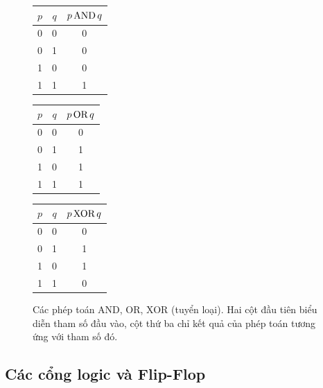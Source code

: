 \begin{figure}[tb]
\centering
  \begin{minipage}{1.5in}
    \begin{tabular}{cc|c}
      $p$ & $q$ & $p \operatorname{\mbox{AND}} q$ \\
      \hline
      0 & 0 & 0 \\
      0 & 1 & 0 \\
      1 & 0 & 0 \\
      1 & 1 & 1
    \end{tabular}
  \end{minipage}
  \begin{minipage}{1.5in}
    \begin{tabular}{cc|c}
      $p$ & $q$ & $p \operatorname{\mbox{OR}} q$ \\
      \hline
      0 & 0 & 0 \\
      0 & 1 & 1 \\
      1 & 0 & 1 \\
      1 & 1 & 1
    \end{tabular}
  \end{minipage}
  \begin{minipage}{1.5in}
    \begin{tabular}{cc|c}
      $p$ & $q$ & $p \operatorname{\mbox{XOR}} q$ \\
      \hline
      0 & 0 & 0 \\
      0 & 1 & 1 \\
      1 & 0 & 1 \\
      1 & 1 & 0
    \end{tabular}
  \end{minipage}
  \caption{Các phép toán AND, OR, XOR (tuyển loại). Hai cột đầu tiên biểu diễn tham số đầu
    vào, cột thứ ba chỉ kết quả của phép toán tương ứng với tham số đó.}
    \label{fig:op-bool1}
\end{figure}

\subsection*{Các cổng logic và Flip-Flop} 


